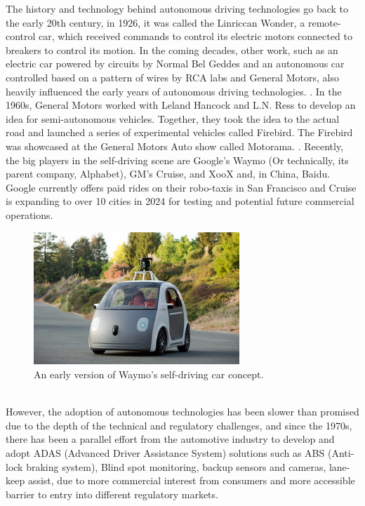 The history and technology behind autonomous driving technologies go back to the early 20th century, in 1926, it was called the Linriccan Wonder, a remote-control car, which received commands to control its electric motors connected to breakers to control its motion. In the coming decades, other work, such as an electric car powered by circuits by Normal Bel Geddes and an autonomous car controlled based on a pattern of wires by RCA labs and General Motors, also heavily influenced the early years of autonomous driving technologies. \cite{divakarla2019review}. In the 1960s, General Motors worked with Leland Hancock and L.N. Ress to develop an idea for semi-autonomous vehicles. Together, they took the idea to the actual road and launched a series of experimental vehicles called Firebird. The Firebird was showcased at the General Motors Auto show called Motorama. \cite{kroger2016automated}. Recently, the big players in the self-driving scene are Google's Waymo (Or technically, its parent company, Alphabet), GM's Cruise, and XooX and, in China, Baidu. Google currently offers paid rides on their robo-taxis in San Francisco and Cruise is expanding to over 10 cities in 2024 for testing and potential future commercial operations. 
\begin{figure}[H]
    \centering
    \includegraphics[width=\textwidth,height=5cm,keepaspectratio=true]{src/Images/waymo_car.jpg}
    \caption{
      An early version of Waymo's self-driving car concept. \cite{waymo_img}
    }
\end{figure}
\\
However, the adoption of autonomous technologies has been slower than promised due to the depth of the technical and regulatory challenges, and since the 1970s, there has been a parallel effort from the automotive industry to develop and adopt ADAS (Advanced Driver Assistance System) solutions such as ABS (Anti-lock braking system), Blind spot monitoring, backup sensors and cameras, lane-keep assist, due to more commercial interest from consumers and more accessible barrier to entry into different regulatory markets. \cite{okuda2014survey}
